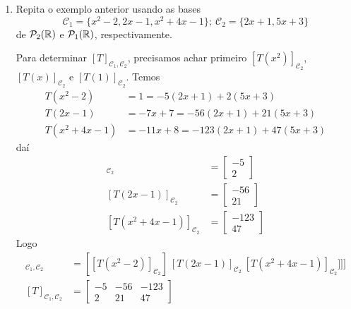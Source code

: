 \begin{exemplos}
\begin{enumerate}[label={\arabic*})]
    \item Repita o exemplo anterior usando as bases
    \[
      \mathcal{C}_1 = \{x^2 - 2, 2x - 1, x^2 + 4x - 1\};\ \mathcal{C}_{2} = \{2x + 1, 5x + 3\}
    \]
    de $\mathcal{P}_2(\mathbb{R})$ e $\mathcal{P}_1(\mathbb{R})$, respectivamente.
    \begin{solucao}
      Para determinar $[T]_{\mathcal{C}_1, \mathcal{C}_2}$, precisamos achar primeiro $[T(x^2)]_{\mathcal{C}_2}$, $[T(x)]_{\mathcal{C}_2}$ e $[T(1)]_{\mathcal{C}_2}$.
      Temos
      \begin{align*}
        T(x^2 - 2) &= 1 = -5(2x + 1) + 2(5x + 3)\\
        T(2x - 1) &= -7x + 7 = -56(2x + 1) + 21(5x + 3)\\
        T(x^2 + 4x - 1) &= -11x + 8 = -123(2x + 1) + 47(5x + 3)
      \end{align*}
      daí
      \begin{align*}
        [T(x^2 - 2)]_{\mathcal{C}_2} &= \begin{bmatrix}-5\\2\end{bmatrix}\\
        [T(2x - 1)]_{\mathcal{C}_2} &= \begin{bmatrix}-56\\21\end{bmatrix}\\
        [T(x^2 + 4x - 1)]_{\mathcal{C}_2} &= \begin{bmatrix}-123\\47\end{bmatrix}
      \end{align*}
      Logo
      \begin{align*}
        [T]_{\mathcal{C}_1, \mathcal{C}_2} &= [[T(x^2 - 2)]_{\mathcal{C}_2}]\ [T(2x - 1)]_{\mathcal{C}_2}\ [T(x^2 + 4x - 1)]_{\mathcal{C}_2}]]]\\
        [T]_{\mathcal{C}_1, \mathcal{C}_2} &= \begin{bmatrix}-5 & -56 & -123\\2 & 21 & 47\end{bmatrix}
      \end{align*}


\end{solucao}
\end{enumerate}
\end{exemplos}

